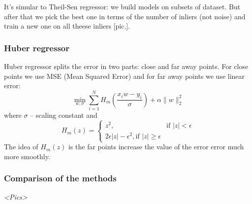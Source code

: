 It's simular to Theil-Sen regressor: we build models on subsets of dataset. But after that we pick the best one in terms of the number of inliers (not noise) and train a new one on all theese inliers [pic.].

\subsubsection*{Huber regressor} 

Huber regressor splits the error in two parts: close and far away points. For close points we use MSE (Mean Squared Error) and for far away points we use linear error:
$$\min\limits_{w,\sigma}\sum\limits_{i=1}^{N}H_{m}\left(\frac{x_iw-y_i}{\sigma}\right)+\alpha\|w\|_2^2$$
where $\sigma$ -- scaling constant and 
$$H_m(z)=\begin{cases}
	z^2, & \text{if } |z|<\epsilon \\
	2\epsilon|z|-\epsilon^2, \text{if } |z|\ge\epsilon
\end{cases}$$
The idea of $H_m(z)$ is the far points increase the value of the error error much more smoothly.

\subsubsection*{Comparison of the methods}

{\it <Pics>}